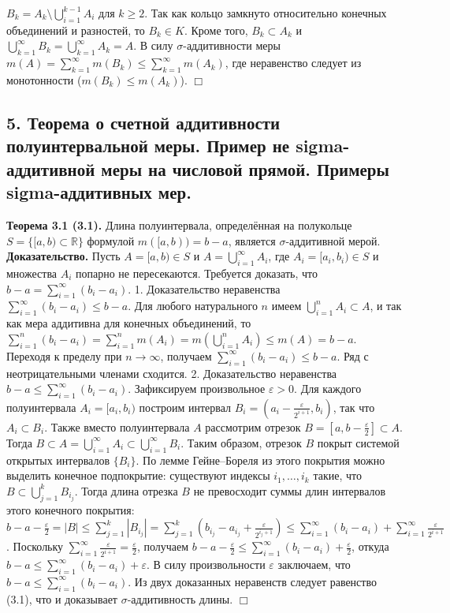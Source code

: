 \documentclass[12pt]{article}
\begin{document}
$B_k = A_k \setminus \bigcup_{i=1}^{k-1} A_i$ для $k \ge 2$. Так как кольцо замкнуто относительно конечных объединений и разностей, то $B_k \in K$. Кроме того, $B_k \subset A_k$ и $\bigcup_{k=1}^{\infty} B_k = \bigcup_{k=1}^{\infty} A_k = A$. В силу $\sigma$-аддитивности меры $m(A) = \sum_{k=1}^{\infty} m(B_k) \le \sum_{k=1}^{\infty} m(A_k)$, где неравенство следует из монотонности ($m(B_k) \le m(A_k)$). \hfill $\Box$

\subsection*{5. Теорема о счетной аддитивности полуинтервальной меры. Пример не sigma-аддитивной
меры на числовой прямой. Примеры sigma-аддитивных мер.}
\textbf{Теорема 3.1 (3.1).} Длина полуинтервала, определённая на полукольце $S = \{[a, b) \subset \mathbb{R}\}$ формулой $m([a, b)) = b - a$, является $\sigma$-аддитивной мерой. \\\textbf{Доказательство.} Пусть $A = [a, b) \in S$ и $A = \bigcup_{i=1}^{\infty} A_i$, где $A_i = [a_i, b_i) \in S$ и множества $A_i$ попарно не пересекаются. Требуется доказать, что $b - a = \sum_{i=1}^{\infty} (b_i - a_i)$. 1. Доказательство неравенства $\sum_{i=1}^{\infty}(b_i - a_i) \le b - a$. Для любого натурального $n$ имеем $\bigcup_{i=1}^{n} A_i \subset A$, и так как мера аддитивна для конечных объединений, то $\sum_{i=1}^{n} (b_i - a_i) = \sum_{i=1}^{n} m(A_i) = m(\bigcup_{i=1}^{n} A_i) \le m(A) = b - a$. Переходя к пределу при $n \to \infty$, получаем $\sum_{i=1}^{\infty}(b_i - a_i) \le b - a$. Ряд с неотрицательными членами сходится. 2. Доказательство неравенства $b - a \le \sum_{i=1}^{\infty}(b_i - a_i)$. Зафиксируем произвольное $\varepsilon > 0$. Для каждого полуинтервала $A_i = [a_i, b_i)$ построим интервал $B_i = (a_i - \tfrac{\varepsilon}{2^{i+1}}, b_i)$, так что $A_i \subset B_i$. Также вместо полуинтервала $A$ рассмотрим отрезок $B = [a, b - \tfrac{\varepsilon}{2}] \subset A$. Тогда $B \subset A = \bigcup_{i=1}^{\infty} A_i \subset \bigcup_{i=1}^{\infty} B_i$. Таким образом, отрезок $B$ покрыт системой открытых интервалов $\{B_i\}$. По лемме Гейне–Бореля из этого покрытия можно выделить конечное подпокрытие: существуют индексы $i_1, \ldots, i_k$ такие, что $B \subset \bigcup_{j=1}^{k} B_{i_j}$. Тогда длина отрезка $B$ не превосходит суммы длин интервалов этого конечного покрытия: $b - a - \tfrac{\varepsilon}{2} = |B| \le \sum_{j=1}^{k} |B_{i_j}| = \sum_{j=1}^{k} (b_{i_j} - a_{i_j} + \tfrac{\varepsilon}{2^{i_j+1}}) \le \sum_{i=1}^{\infty} (b_i - a_i) + \sum_{i=1}^{\infty} \tfrac{\varepsilon}{2^{i+1}}$. Поскольку $\sum_{i=1}^{\infty} \tfrac{\varepsilon}{2^{i+1}} = \tfrac{\varepsilon}{2}$, получаем $b - a - \tfrac{\varepsilon}{2} \le \sum_{i=1}^{\infty} (b_i - a_i) + \tfrac{\varepsilon}{2}$, откуда $b - a \le \sum_{i=1}^{\infty} (b_i - a_i) + \varepsilon$. В силу произвольности $\varepsilon$ заключаем, что $b - a \le \sum_{i=1}^{\infty}(b_i - a_i)$. Из двух доказанных неравенств следует равенство (3.1), что и доказывает $\sigma$-аддитивность длины. \hfill $\Box$
\end{document}
